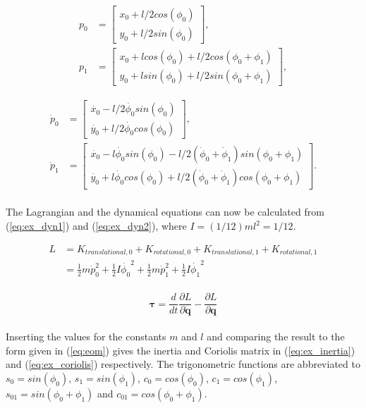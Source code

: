 \begin{equation}
    \begin{split}
        p_0 &=
        \begin{bmatrix}
            x_0 + l/2 cos(\phi_0)\\
            y_0 + l/2 sin(\phi_0)
        \end{bmatrix}, \\
        p_1 &=
        \begin{bmatrix}
            x_0 + l cos(\phi_0) + l/2 cos(\phi_0+ \phi_1)\\
            y_0 + l sin(\phi_0) + l/2 sin(\phi_0+\phi_1)
        \end{bmatrix},
    \end{split}
\end{equation}

\begin{equation}
    \begin{split}
        \dot{p}_0 &=
        \begin{bmatrix}
            \dot{x_0} - l/2 \dot{\phi_0} sin(\phi_0)\\
            \dot{y_0} + l/2 \dot{\phi_0} cos(\phi_0)
        \end{bmatrix}, \\
        \dot{p}_1 &=
        \begin{bmatrix}
            \dot{x_0} - l \dot{\phi_0} sin(\phi_0) - l/2 (\dot{\phi}_0 +\dot{\phi}_1) sin(\phi_0+\phi_1)\\
            \dot{y_0} + l \dot{\phi_0} cos(\phi_0) + l/2 (\dot{\phi}_0 +\dot{\phi}_1) cos(\phi_0+\phi_1)
        \end{bmatrix}.
    \end{split}
\end{equation}
\\
The Lagrangian and the dynamical equations can now be calculated from (\ref{eq:ex_dyn1}) and (\ref{eq:ex_dyn2}), where $I = (1/12)ml^2 = 1/12$.

\begin{equation}\label{eq:ex_dyn1}
    \begin{split}
        L &= K_{translational,0} + K_{rotational,0} + K_{translational,1} + K_{rotational,1}\\
        &= \frac{1}{2} m \dot{p}_0^2 + \frac{1}{2}I\dot{\phi_0}^2 + \frac{1}{2} m \dot{p}_1^2 + \frac{1}{2}I\dot{\phi_1}^2
    \end{split}
\end{equation}
\\
\begin{equation}\label{eq:ex_dyn2}
    \boldsymbol{\tau} = \frac{d}{dt} \frac{\partial L}{\partial \dot{\mathbf{q}}} - \frac{\partial L}{\partial \mathbf{q}}
\end{equation}
\\
Inserting the values for the constants $m$ and $l$ and comparing the result to the form given in (\ref{eq:eom}) gives the inertia and Coriolis matrix in (\ref{eq:ex_inertia}) and (\ref{eq:ex_coriolis}) respectively. The trigonometric functions are abbreviated to $s_0 = sin(\phi_0)$, $s_1 = sin(\phi_1)$, $c_0 = cos(\phi_0)$, $c_1 = cos(\phi_1)$, $s_{01} = sin(\phi_0+\phi_1)$ and $c_{01} = cos(\phi_0+\phi_1)$.

